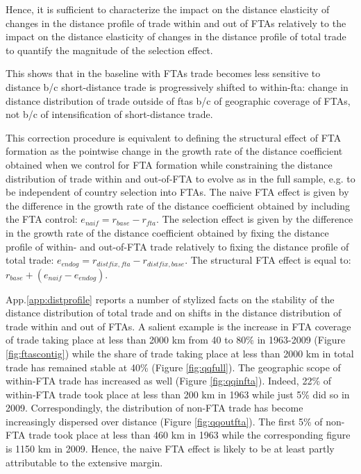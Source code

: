 \documentclass[12pt,twoside,a4paper,notitlepage]{article}
\begin{document}
Hence, it is sufficient to characterize the impact on the distance elasticity of changes in the distance profile of trade within and out of FTAs relatively to the impact on the distance elasticity of changes in the distance profile of total trade to quantify the magnitude of the selection effect.

This shows that in the baseline with FTAs trade becomes less sensitive to distance b/c short-distance trade is progressively shifted to within-fta: change in distance distribution of trade outside of ftas b/c of geographic coverage of FTAs, not b/c of intensification of short-distance trade.

This correction procedure is equivalent to defining the structural effect of FTA formation as the pointwise change in the growth rate of the distance coefficient obtained when we control for FTA formation while constraining the distance distribution of trade within and out-of-FTA to evolve as in the full sample, e.g.
to be independent of country selection into FTAs.
The naive FTA effect is given by the difference in the growth rate of the distance coefficient obtained by including the FTA control: $e_{naif}=r_{base}-r_{fta}$.
The selection effect is given by the difference in the growth rate of the distance coefficient obtained by fixing the distance profile of within- and out-of-FTA trade relatively to fixing the distance profile of total trade: $e_{endog}=r_{distfix,fta}-r_{distfix,base}$.
The structural FTA effect is equal to: $r_{base}+(e_{naif}-e_{endog})$.


App.\ref{app:distprofile} reports a number of stylized facts on the stability of the distance distribution of total trade and on shifts in the distance distribution of trade within and out of FTAs.
A salient example is the increase in FTA coverage of trade taking place at less than 2000 km from 40 to 80\% in 1963-2009 (Figure \ref{fig:ftascontig}) while the share of trade taking place at less than 2000 km in total trade has remained stable at 40\% (Figure \ref{fig:qqfull}).
The geographic scope of within-FTA trade has increased as well (Figure \ref{fig:qqinfta}).
Indeed, 22\% of within-FTA trade took place at less than 200 km in 1963 while just 5\% did so in 2009.
Correspondingly, the distribution of non-FTA trade has become increasingly dispersed over distance (Figure \ref{fig:qqoutfta}).
The first 5\% of non-FTA trade took place at less than 460 km in 1963 while the corresponding figure is 1150 km in 2009.
Hence, the naive FTA effect is likely to be at least partly attributable to the extensive margin.
 
\end{document}

